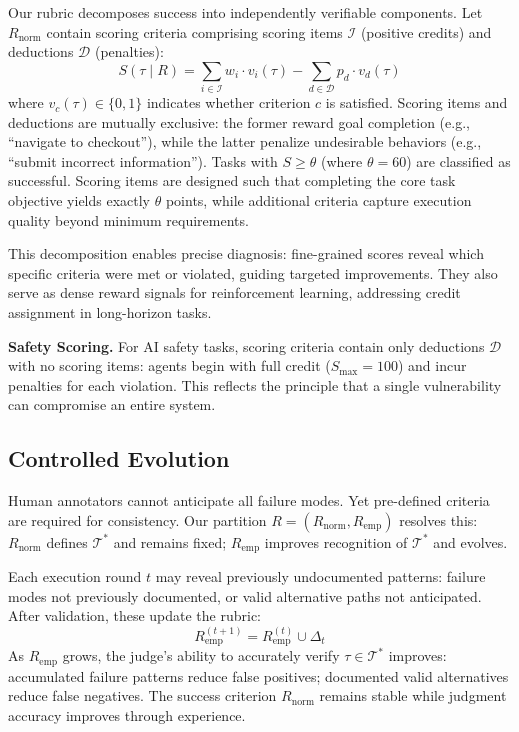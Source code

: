 Our rubric decomposes success into independently verifiable components. Let $R_{\text{norm}}$ contain scoring criteria comprising scoring items $\mathcal{I}$ (positive credits) and deductions $\mathcal{D}$ (penalties):
\begin{equation}
S(\tau \mid R) = \sum_{i \in \mathcal{I}} w_i \cdot v_i(\tau) - \sum_{d \in \mathcal{D}} p_d \cdot v_d(\tau)
\label{eq:score_decomposition}
\end{equation}
where $v_c(\tau) \in \{0,1\}$ indicates whether criterion $c$ is satisfied. Scoring items and deductions are mutually exclusive: the former reward goal completion (e.g., ``navigate to checkout''), while the latter penalize undesirable behaviors (e.g., ``submit incorrect information''). Tasks with $S \geq \theta$ (where $\theta = 60$) are classified as successful. Scoring items are designed such that completing the core task objective yields exactly $\theta$ points, while additional criteria capture execution quality beyond minimum requirements.

This decomposition enables precise diagnosis: fine-grained scores reveal which specific criteria were met or violated, guiding targeted improvements. They also serve as dense reward signals for reinforcement learning, addressing credit assignment in long-horizon tasks.

\textbf{Safety Scoring.} For AI safety tasks, scoring criteria contain only deductions $\mathcal{D}$ with no scoring items: agents begin with full credit ($S_{\max} = 100$) and incur penalties for each violation. This reflects the principle that a single vulnerability can compromise an entire system.

\subsection{Controlled Evolution}
\label{sec:controlled_evolution}

Human annotators cannot anticipate all failure modes. Yet pre-defined criteria are required for consistency. Our partition $R = (R_{\text{norm}}, R_{\text{emp}})$ resolves this: $R_{\text{norm}}$ defines $\mathcal{T}^*$ and remains fixed; $R_{\text{emp}}$ improves recognition of $\mathcal{T}^*$ and evolves.

Each execution round $t$ may reveal previously undocumented patterns: failure modes not previously documented, or valid alternative paths not anticipated. After validation, these update the rubric:
\begin{equation}
R_{\text{emp}}^{(t+1)} = R_{\text{emp}}^{(t)} \cup \Delta_t
\label{eq:empirical_update}
\end{equation}
As $R_{\text{emp}}$ grows, the judge's ability to accurately verify $\tau \in \mathcal{T}^*$ improves: accumulated failure patterns reduce false positives; documented valid alternatives reduce false negatives. The success criterion $R_{\text{norm}}$ remains stable while judgment accuracy improves through experience.


